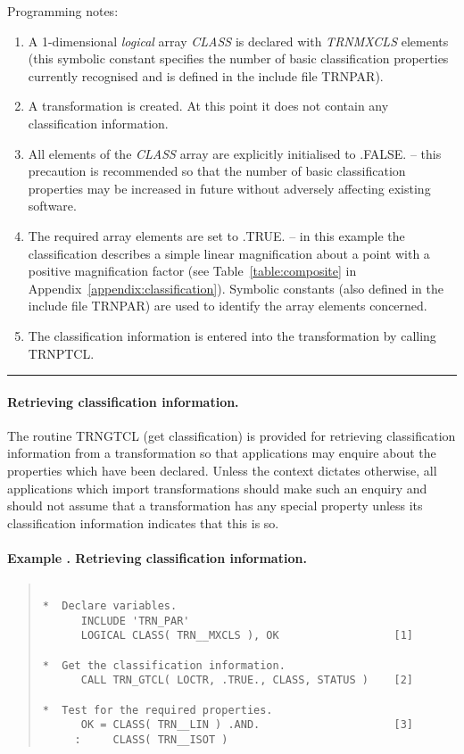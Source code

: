 \documentclass[twoside,11pt]{article}
\renewcommand{\_}{\texttt{\symbol{95}}}
\newcommand{\name}[1]{\mbox{\small{#1}}}
\newcommand{\fortvar}[1]{\mbox{\emph{#1}}}
\newcounter{examplecounter}
\newcommand{\example}[1]{\addtocounter{examplecounter}{1}
                         \paragraph{\textbf{Example \theexamplecounter. #1}}}
\newcommand{\exampledone}[0]{\begin{center} \rule{6em}{0.2mm} \end{center}}
\begin{document}
Programming notes:

\begin{enumerate}

\item A 1-dimensional {\em logical} array \fortvar{CLASS} is declared with
\fortvar{TRN\_\_MXCLS} elements (this symbolic constant specifies the number
of basic classification properties currently recognised and is defined in
the include file \name{TRN\_PAR}).

\item A transformation is created.
At this point it does not contain any classification information.

\item All elements of the \fortvar{CLASS} array are explicitly initialised
to \name{.FALSE.} -- this precaution is recommended so that the number of
basic classification properties may be increased in future without adversely
affecting existing software.

\item The required array elements are set to \name{.TRUE.} -- in this
example the classification describes a simple linear magnification about a
point with a positive magnification factor (see Table~\ref{table:composite}
in Appendix~\ref{appendix:classification}).
Symbolic constants (also defined in the include file \name{TRN\_PAR}) are
used to identify the array elements concerned.

\item The classification information is entered into the transformation by
calling \name{TRN\_PTCL}.

\end{enumerate}
\exampledone

\paragraph{Retrieving classification information.}
The routine \name{TRN\_GTCL} (get classification) is provided for retrieving
classification information from a transformation so that applications may
enquire about the properties which have been declared.
Unless the context dictates otherwise, all applications which import
transformations should make such an enquiry and should not assume that a
transformation has any special property unless its classification
information indicates that this is so.

\example{Retrieving classification information.}

\begin{quote} 
\begin{verbatim}

*  Declare variables.
      INCLUDE 'TRN_PAR'
      LOGICAL CLASS( TRN__MXCLS ), OK                  [1]

*  Get the classification information.
      CALL TRN_GTCL( LOCTR, .TRUE., CLASS, STATUS )    [2]

*  Test for the required properties.
      OK = CLASS( TRN__LIN ) .AND.                     [3]
     :     CLASS( TRN__ISOT )

\end{verbatim}
\end{quote}
\end{document}
